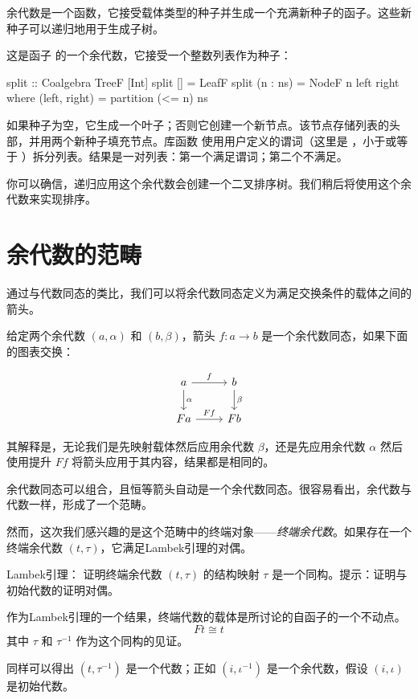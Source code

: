 \documentclass[DaoFP]{subfiles}
\begin{document}
余代数是一个函数，它接受载体类型的种子并生成一个充满新种子的函子。这些新种子可以递归地用于生成子树。

这是函子  的一个余代数，它接受一个整数列表作为种子：
\begin{haskell}
split :: Coalgebra TreeF [Int]
split [] = LeafF
split (n : ns) = NodeF n left right
  where
    (left, right) = partition (<= n) ns
\end{haskell}
如果种子为空，它生成一个叶子；否则它创建一个新节点。该节点存储列表的头部，并用两个新种子填充节点。库函数  使用用户定义的谓词（这里是 ，小于或等于 ）拆分列表。结果是一对列表：第一个满足谓词；第二个不满足。

你可以确信，递归应用这个余代数会创建一个二叉排序树。我们稍后将使用这个余代数来实现排序。

\section{余代数的范畴}

通过与代数同态的类比，我们可以将余代数同态定义为满足交换条件的载体之间的箭头。

给定两个余代数 $(a, \alpha)$ 和 $(b, \beta)$，箭头 $f \colon a \to b$ 是一个余代数同态，如果下面的图表交换：

\[
 \begin{tikzcd}
 a 
 \arrow[r, "f"]
 \arrow[d, "\alpha"]
 & b
\arrow[d, "\beta"]
 \\
F  a
 \arrow[r, "F f"]
 & F b
  \end{tikzcd}
\]

其解释是，无论我们是先映射载体然后应用余代数 $\beta$，还是先应用余代数 $\alpha$ 然后使用提升 $F f$ 将箭头应用于其内容，结果都是相同的。

余代数同态可以组合，且恒等箭头自动是一个余代数同态。很容易看出，余代数与代数一样，形成了一个范畴。

然而，这次我们感兴趣的是这个范畴中的终端对象——\emph{终端余代数}。如果存在一个终端余代数 $(t, \tau)$，它满足Lambek引理的对偶。

\begin{exercise}{Lambek引理：}
证明终端余代数 $(t, \tau)$ 的结构映射 $\tau$ 是一个同构。提示：证明与初始代数的证明对偶。
\end{exercise}

作为Lambek引理的一个结果，终端代数的载体是所讨论的自函子的一个不动点。
\[ F t \cong t \]
其中 $\tau$ 和 $\tau^{-1}$ 作为这个同构的见证。

同样可以得出 $(t, \tau^{-1})$ 是一个代数；正如 $(i, \iota^{-1})$ 是一个余代数，假设 $(i, \iota)$ 是初始代数。
\end{document}
